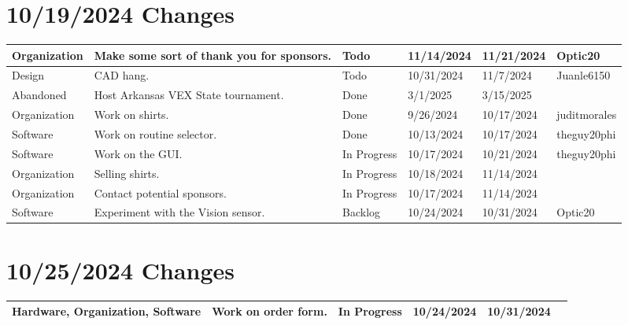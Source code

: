 \section{10/19/2024 Changes}
\begin{center}
\begin{longtable}{| p{40pt} | p{150pt} | p{35pt} | p{33pt} | p{33pt} | p{40pt} |}
\hline \rowcolor{IndianRed1}
Organization & Make some sort of thank you for sponsors. & Todo & 11/14/2024 & 11/21/2024 & Optic20 \\
\hline \rowcolor{IndianRed1}
Design & CAD hang. & Todo & 10/31/2024 & 11/7/2024 & Juanle6150 \\
\hline \rowcolor{DarkSeaGreen1}
Abandoned & Host Arkansas VEX State tournament. & Done & 3/1/2025 & 3/15/2025 & \\
\hline \rowcolor{DarkSeaGreen1}
Organization & Work on shirts. & Done & 9/26/2024 & 10/17/2024 & juditmorales \\
\hline \rowcolor{DarkSeaGreen1}
Software & Work on routine selector. & Done & 10/13/2024 & 10/17/2024 & theguy20phi \\
\hline \rowcolor{LightGoldenrod1}
Software & Work on the GUI. & In Progress & 10/17/2024 & 10/21/2024 & theguy20phi \\
\hline \rowcolor{LightGoldenrod1}
Organization & Selling shirts. & In Progress & 10/18/2024 & 11/14/2024 & \\
\hline \rowcolor{LightGoldenrod1}
Organization & Contact potential sponsors. & In Progress & 10/17/2024 & 11/14/2024 & \\
\hline \rowcolor{Ivory2}
Software & Experiment with the Vision sensor. & Backlog & 10/24/2024 & 10/31/2024 & Optic20 \\
\hline
\end{longtable}
\end{center}


\section{10/25/2024 Changes}
\begin{center}
\begin{longtable}{| p{40pt} | p{150pt} | p{35pt} | p{33pt} | p{33pt} | p{40pt} |}
\hline \rowcolor{LightGoldenrod1}
Hardware, Organization, Software & Work on order form. & In Progress & 10/24/2024 & 10/31/2024 & \\
\hline
\end{longtable}
\end{center}


